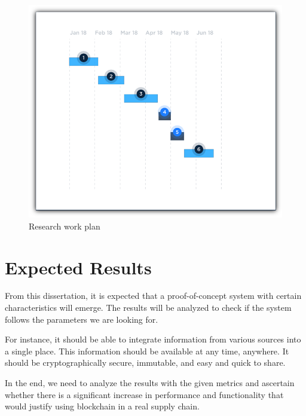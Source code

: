 \begin{figure}[ht]
\centering
\includegraphics[scale=0.75]{media/gantt.png}
\caption{Research work plan}
\label{fig:gantt_chart}
\end{figure}

\section{Expected Results}
From this dissertation, it is expected that a proof-of-concept system with certain characteristics will emerge. The results will be analyzed to check if the system follows the parameters we are looking for.

For instance, it should be able to integrate information from various sources into a single place. This information should be available at any time, anywhere. It should be cryptographically secure, immutable, and easy and quick to share.

In the end, we need to analyze the results with the given metrics and ascertain whether there is a significant increase in performance and functionality that would justify using blockchain in a real supply chain.




